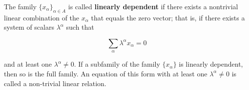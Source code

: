 The family $\{x_{\alpha}\}_{\alpha \in A}$ is called \textbf{linearly dependent} if there exists a nontrivial linear combination of the $x_{\alpha}$ that equals the zero vector; that is, if there exists a system of scalars $\lambda^{\alpha}$ such that

$$\sum_{\alpha} \lambda^{\alpha} x_{\alpha} = 0$$

and at least one $\lambda^{\alpha} \neq 0$. If a subfamily of the family $\{x_{\alpha}\}$ is linearly dependent, then so is the full family. An equation of this form with at least one $\lambda^{\alpha} \neq 0$ is called a non-trivial linear relation.
